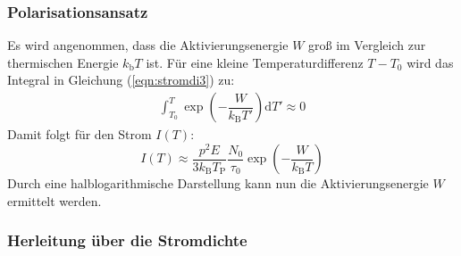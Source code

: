 \subsubsection{Polarisationsansatz}
Es wird angenommen, dass die Aktivierungsenergie $W$ groß im Vergleich zur thermischen Energie $k_\mathrm{b} T$ ist. Für eine kleine Temperaturdifferenz $T-T_\mathrm{0}$ wird das Integral in Gleichung (\ref{eqn:stromdi3}) zu:
\begin{align*}
  \int_{T_0}^T\exp{\left(-\dfrac{W}{k_\mathrm{B}T'}\right)\mathrm{d}T'}\approx0
\end{align*}
Damit folgt für den Strom $I(T)$:
\begin{equation}
  \label{eqn:polarime}
  I(T)\approx \dfrac{p^2 E}{3k_\mathrm{B}T_\mathrm{P}}\dfrac{N_\mathrm{0}}{\tau_\mathrm{0}}\exp\left(-\dfrac{W}{k_\mathrm{B}T}\right)
\end{equation}
Durch eine halblogarithmische Darstellung kann nun die Aktivierungsenergie $W$ ermittelt werden.
\subsubsection{Herleitung über die Stromdichte}
